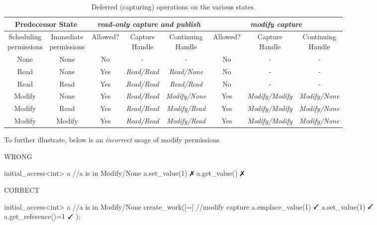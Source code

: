 \begin{table}[!t]
\begin{center}
{\small
\begin{tabular}{cc|ccc|ccc}
 \hline
 \multicolumn{2}{c|}{Predecessor State} 
 & \multicolumn{3}{c|}{\em{read-only capture} and publish} 
 & \multicolumn{3}{c}{\em{modify capture}}  \\
 \hline
 \specialcell{Scheduling\\ permissions} 
 & \specialcell{Immediate\\ permissions}  
 & {\footnotesize Allowed? } &  \specialcell{\footnotesize Capture\\Handle} 
 &  \specialcell{\footnotesize Continuing\\Handle} 
 & {\footnotesize Allowed? } &  \specialcell{\footnotesize Capture\\Handle} 
 &  \specialcell{\footnotesize Continuing\\Handle} \\
 \hline
 None & None & No & - & - & No & - & - \\
 Read & None 
 & Yes 
 & {\em Read/Read}
 & {\em Read/None}
 & No
 & -
 & - \\
 Read & Read
 & Yes 
 & {\em Read/Read}
 & {\em Read/Read}
 & No
 & -
 & - \\
 Modify & None
 & Yes 
 & {\em Read/Read}
 & {\em Modify/None}
 & Yes
 & {\em Modify/Modify} 
 & {\em Modify/None} \\
 Modify & Read
 & Yes 
 & {\em Read/Read}
 & {\em Modify/Read}
 & Yes
 & {\em Modify/Modify} 
 & {\em Modify/None} \\
 Modify & Modify
 & Yes 
 & {\em Read/Read} 
 & {\em Modify/Read} 
 & Yes
 & {\em Modify/Modify}
 & {\em Modify/None} \\
\end{tabular}
}
\caption{Deferred (capturing) operations on the various states.}
\label{tab:capsimp}
\end{center}
\end{table}


To further illustrate, below is an \emph{incorrect} usage of modify permissions

\begin{minipage}[t]{0.45\linewidth}
\centering WRONG
\begin{vaspPseudo}
initial_access<int> a
//a is in Modify/None
a.set_value(1) $\no$ 
a.get_value()  $\no$
\end{vaspPseudo}
\end{minipage}
\begin{minipage}[t]{0.45\linewidth}
\centering CORRECT
\begin{vaspPseudo}
initial_access<int> a
//a is in Modify/None
create_work([=]{ //modify capture
    a.emplace_value(1)  $\yes$
    a.set_value(1)      $\yes$
    a.get_reference()=1 $\yes$
});
\end{vaspPseudo}
\end{minipage}


